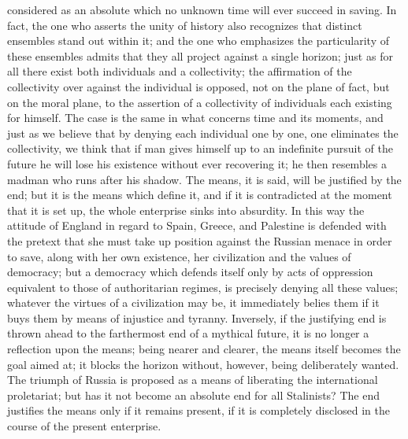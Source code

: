\documentclass[11pt]{article}
\begin{document}
{{considered as an absolute which no unknown time will ever succeed in saving. In fact, the one who asserts the unity of history also recognizes that distinct ensembles stand out within it; and the one who emphasizes the particularity of these ensembles admits that they all project against a single horizon; just as for all there exist both individuals and a collectivity; the affirmation of the collectivity over against the individual is opposed, not on the plane of fact, but on the moral plane, to the assertion of a collectivity of individuals each existing for himself. The case is the same in what concerns time and its moments, and just as we believe that by denying each individual one by one, one eliminates the collectivity, we think that if man gives himself up to an indefinite pursuit of the future he will lose his existence without ever recovering it; he then resembles a madman who runs after his shadow. The means, it is said, will be justified by the end; but it is the means which define it, and if it is contradicted at the moment that it is set up, the whole enterprise sinks into absurdity. In this way the attitude of England in regard to Spain, Greece, and Palestine is defended with the pretext that she must take up position against the Russian menace in order to save, along with her own existence, her civilization and the values of democracy; but a democracy which defends itself only by acts of oppression equivalent to those of authoritarian regimes, is precisely denying all these values; whatever the virtues of a civilization may be, it immediately belies them if it buys them by means of injustice and tyranny. Inversely, if the justifying end is thrown ahead to the farthermost end of a mythical future, it is no longer a reflection upon the means; being nearer and clearer, the means itself becomes the goal aimed at; it blocks the horizon without, however, being deliberately wanted. The triumph of Russia is proposed as a means of liberating the international proletariat; but has it not become an absolute end for all Stalinists? The end justifies the means only if it remains present, if it is completely disclosed in the course of the present enterprise.

}}
\end{document}
